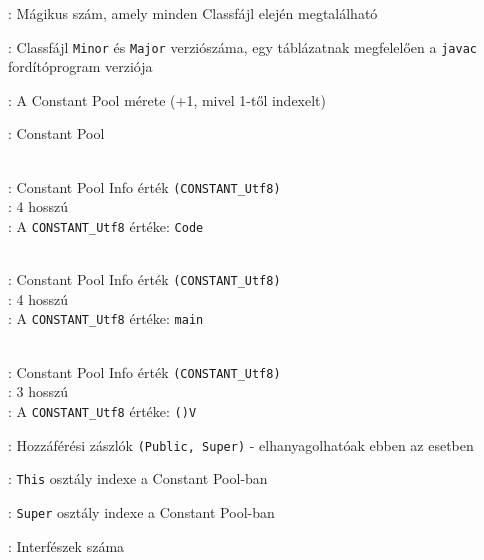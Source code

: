 \begin{compactitem}
\setlength\itemsep{-5px}
\item {}: Mágikus szám, amely minden Classfájl elején megtalálható
\item {} : Classfájl \lstinline{Minor} és \lstinline{Major} verziószáma, egy táblázatnak megfelelően a \lstinline{javac} fordítóprogram verziója
\item {}: A Constant Pool mérete (+1, mivel 1-től indexelt)
\item {}: Constant Pool
\begin{compactitem}
    \setlength\itemsep{-5px}
    \item {}   \\
    : Constant Pool Info érték \lstinline{(CONSTANT_Utf8)} \\
    : 4 hosszú \\
    : A \lstinline{CONSTANT_Utf8} értéke: \lstinline{Code}
    \item {}   \\
    : Constant Pool Info érték \lstinline{(CONSTANT_Utf8)} \\
    : 4 hosszú \\
    : A \lstinline{CONSTANT_Utf8} értéke: \lstinline{main}
    \item {}   \\
    : Constant Pool Info érték \lstinline{(CONSTANT_Utf8)} \\
    : 3 hosszú \\
    : A \lstinline{CONSTANT_Utf8} értéke: \lstinline{()V}
\end{compactitem}
\item {}: Hozzáférési zászlók \lstinline{(Public, Super)} - elhanyagolhatóak ebben az esetben
\item {}: \lstinline{This} osztály indexe a Constant Pool-ban
\item {}: \lstinline{Super} osztály indexe a Constant Pool-ban
\item {}: Interfészek száma

\end{compactitem}
